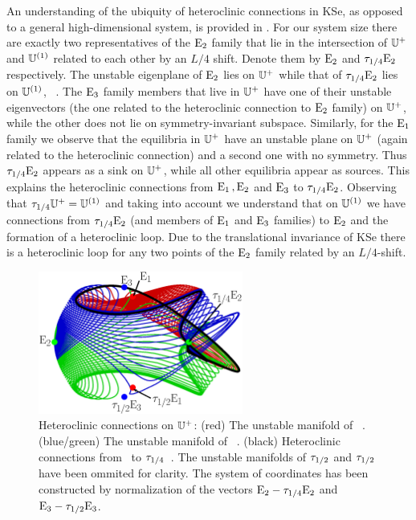 An understanding of the ubiquity of heteroclinic connections in KSe, as
opposed to a general high-dimensional system, is provided in .
For our system size
there are exactly two representatives
of the $\mathrm{E}_{2}$ family that lie in the intersection of $\mathbb{U}^+$ and $\mathbb{U}^{(1)}$ related
to each other by an $L/4$ shift. Denote them by $\mathrm{E}_{2}$ and $\tau_{1/4}\mathrm{E}_{2}$ respectively. The unstable eigenplane of
$\mathrm{E}_{2}$ lies on $\mathbb{U}^+$ while that of $\tau_{1/4}\mathrm{E}_{2}$ lies on $\mathbb{U}^{(1)}$, \cf\ .
The $\mathrm{E}_{3}$ family members that live in $\mathbb{U}^+$ have one of their unstable eigenvectors (the one related to the heteroclinic
connection to $\mathrm{E}_{2}$ family)  on $\mathbb{U}^+$, while the other does not lie on symmetry-invariant subspace.
Similarly, for the $\mathrm{E}_{1}$ family we observe that the equilibria in $\mathbb{U}^+$ have
an unstable plane on $\mathbb{U}^+$ (again related to the heteroclinic connection) and a second one with no symmetry.
Thus $\tau_{1/4}\mathrm{E}_{2}$ appears as a sink on $\mathbb{U}^+$, while all other equilibria appear as sources.
This explains the heteroclinic connections from $\mathrm{E}_{1}\,,\mathrm{E}_{2}$ and $\mathrm{E}_{3}$ to $\tau_{1/4}\mathrm{E}_{2}$.
Observing that $\tau_{1/4} \mathbb{U}^+= \mathbb{U}^{(1)}$ and taking into account  we understand that on $\mathbb{U}^{(1)}$
we have connections from $\tau_{1/4}\mathrm{E}_{2}$ (and members of $\mathrm{E}_{1}$ and $\mathrm{E}_{3}$ families) to $\mathrm{E}_{2}$ and the
formation of a heteroclinic loop.
Due to the translational invariance of KSe there is
a heteroclinic loop for any two points
of the $\mathrm{E}_{2}$ family related by an $L/4$-shift.

\begin{figure}[t]
\begin{center}
        \includegraphics[width=0.6\textwidth]{figs/KS22hetero.eps}
\end{center}
\caption{ Heteroclinic connections on $\mathbb{U}^+$: 
 (red) The unstable manifold of ~\eqv.
 (blue/green) The unstable manifold of ~\eqv.
 (black) Heteroclinic connections from ~\eqv to $\tau_{1/4}$~\eqv.
 The unstable manifolds of $\tau_{1/2}$ and $\tau_{1/2}$ have been ommited
 for clarity. The system of coordinates has been constructed by normalization of the vectors 
 $\mathrm{E}_{2}-\tau_{1/4}\mathrm{E}_{2}$ and $\mathrm{E}_{3}-\tau_{1/2}\mathrm{E}_{3}$.}
\label{f:KS22hetero}
\end{figure}

